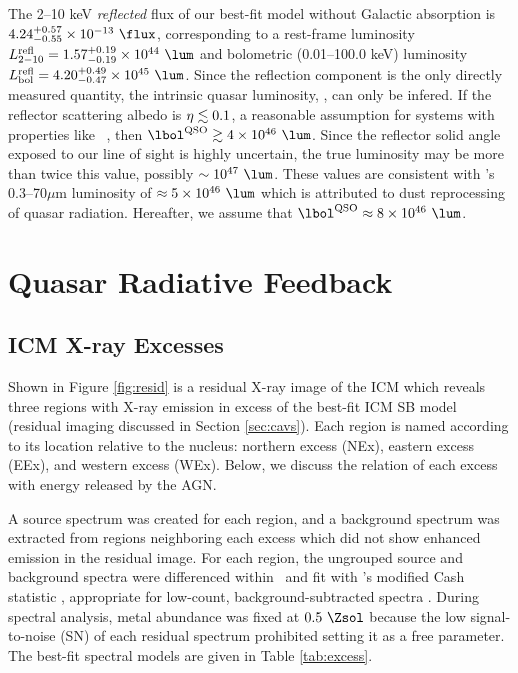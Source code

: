 \documentclass[useAMS,usenatbib]{mn2e}
\begin{document}
The 2--10 keV {\it{reflected}} flux of our best-fit model without
Galactic absorption is $4.24^{+0.57}_{-0.55} \times 10^{-13} ~\flux$,
corresponding to a rest-frame luminosity $L^{\rm{refl}}_{2-10} =
1.57^{+0.19}_{-0.19} \times 10^{44} ~\lum$ and bolometric (0.01--100.0
keV) luminosity $L_{\rm{bol}}^{\rm{refl}} = 4.20^{+0.49}_{-0.47}
\times 10^{45} ~\lum$. Since the reflection component is the only
directly measured quantity, the intrinsic quasar luminosity, \lqso,
can only be infered. If the reflector scattering albedo is $\eta \lesssim
0.1$, a reasonable assumption for systems with properties like
\irs\ \citep{2009MNRAS.397.1549M}, then $\lqso \ga 4 \times 10^{46}
~\lum$. Since the reflector solid angle exposed to our line of sight
is highly uncertain, the true luminosity may be more than twice this
value, possibly $\sim 10^{47} ~\lum$. These values are consistent with
\irs's 0.3--70$\mu$m luminosity of $\approx 5 \times 10^{46} ~\lum$
\citep[][H99]{1988ApJ...328..161K} which is attributed to dust
reprocessing of quasar radiation. Hereafter, we assume that $\lqso
\approx 8 \times 10^{46} ~\lum$.

\section{Quasar Radiative Feedback}
\label{sec:excess}

\subsection{ICM X-ray Excesses}

Shown in Figure \ref{fig:resid} is a residual X-ray image of the ICM
which reveals three regions with X-ray emission in excess of the
best-fit ICM SB model (residual imaging discussed in Section
\ref{sec:cavs}). Each region is named according to its location
relative to the nucleus: northern excess (NEx), eastern excess (EEx),
and western excess (WEx). Below, we discuss the relation of each
excess with energy released by the AGN.

A source spectrum was created for each region, and a background
spectrum was extracted from regions neighboring each excess which did
not show enhanced emission in the residual image. For each region, the
ungrouped source and background spectra were differenced within
\xspec\ and fit with \xspec's modified Cash statistic
\citep{1979ApJ...228..939C}, appropriate for low-count,
background-subtracted spectra \citep[see \xspec\ Manual Appendix B
  and][]{1989ApJ...342.1207N, 2004A&A...423...75V,
  2007A&A...462..429B, 2007ApJ...666..835B,
  2009A&A...503...35E}. During spectral analysis, metal abundance was
fixed at $0.5 ~\Zsol$ because the low signal-to-noise (SN) of each
residual spectrum prohibited setting it as a free parameter. The
best-fit spectral models are given in Table \ref{tab:excess}.
\end{document}

